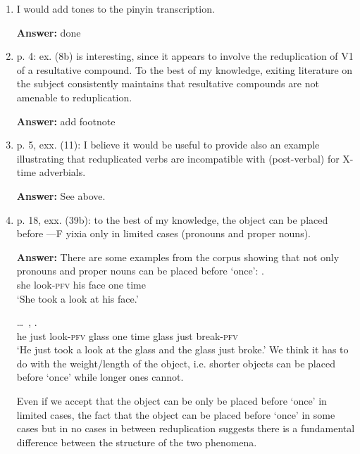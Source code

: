 \documentclass[fleqn,twoside]{article}
\begin{document}
\begin{enumerate}
\item
I would add tones to the pinyin transcription.

\textbf{Answer:} done

\item
p. 4: ex. (8b) is interesting, since it appears to involve the reduplication of V1 of a resultative compound. To the best of my knowledge, exiting literature on the subject consistently maintains that resultative compounds are not amenable to reduplication.


\textbf{Answer:} add footnote

\item
p. 5, exx. (11): I believe it would be useful to provide also an example illustrating that reduplicated verbs are incompatible with (post-verbal) for X-time adverbials.

\textbf{Answer:} See above.

\item
p. 18, exx. (39b): to the best of my knowledge, the object can be placed before —F yixia only in limited cases (pronouns and proper nouns).

\noindent
\textbf{Answer:}
There are some examples from the corpus showing that not only pronouns and proper nouns can be placed before   `once':
\ea%
\gll {}     .\\
she look-\textsc{pfv} his face one time\\
\glt `She took a look at his face.'

\ex%
\gll {} \ldots\,     ,   .\\
he {} just look-\textsc{pfv} glass one time glass just break-\textsc{pfv}\\
\glt `He just took a look at the glass and the glass just broke.'
\z
We think it has to do with the weight/length of the object, i.e. shorter objects can be placed before    `once' while longer ones cannot.

Even if we accept that the object can be only be placed before    `once' in limited cases,
the fact that the object can be placed before    `once' in some cases but in no cases in between reduplication suggests there is a fundamental difference between the structure of the two phenomena.


\end{enumerate}
\end{document}
